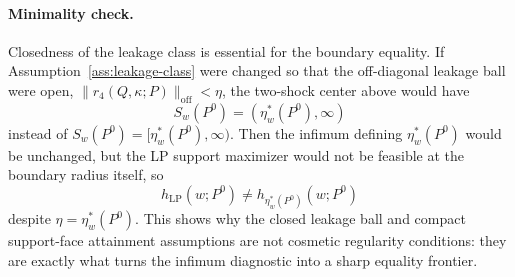 \paragraph{Minimality check.}
Closedness of the leakage class is essential for the boundary equality.  If Assumption~\ref{ass:leakage-class} were changed so that the off-diagonal leakage ball were open, \(\|r_4(Q,\kappa;P)\|_{\mathrm{off}}<\eta\), the two-shock center above would have
\[
S_w(P^0)=(\eta_w^*(P^0),\infty)
\]
instead of \(S_w(P^0)=[\eta_w^*(P^0),\infty)\).  Then the infimum defining \(\eta_w^*(P^0)\) would be unchanged, but the LP support maximizer would not be feasible at the boundary radius itself, so
\[
h_{\mathrm{LP}}(w;P^0)\ne h_{\eta_w^*(P^0)}(w;P^0)
\]
despite \(\eta=\eta_w^*(P^0)\).  This shows why the closed leakage ball and compact support-face attainment assumptions are not cosmetic regularity conditions: they are exactly what turns the infimum diagnostic into a sharp equality frontier.
